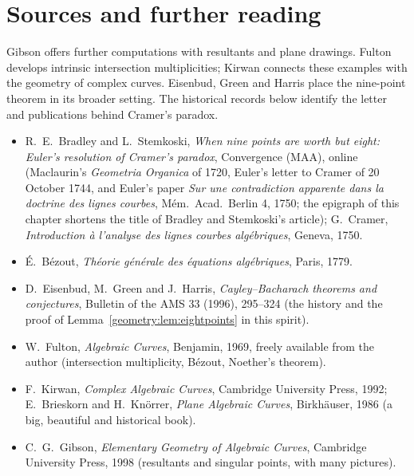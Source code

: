 \section*{Sources and further reading}

Gibson offers further computations with resultants and plane drawings. Fulton develops intrinsic intersection multiplicities; Kirwan connects these examples with the geometry of complex curves. Eisenbud, Green and Harris place the nine-point theorem in its broader setting. The historical records below identify the letter and publications behind Cramer's paradox.

\begin{itemize}
\item R.~E.~Bradley and L.~Stemkoski, \emph{When nine points are worth but eight: Euler's resolution of Cramer's paradox}, Convergence (MAA), online (Maclaurin's
\emph{Geometria Organica} of 1720, Euler's letter to Cramer of 20 October 1744, and Euler's paper \emph{Sur une contradiction apparente dans la doctrine des
lignes courbes}, M\'em.\ Acad.\ Berlin 4, 1750; the epigraph of this chapter shortens the title of Bradley and Stemkoski's article); G.~Cramer, \emph{Introduction \`a l'analyse des lignes courbes
alg\'ebriques}, Geneva, 1750.
\item \'E.~B\'ezout, \emph{Th\'eorie g\'en\'erale des \'equations alg\'ebriques}, Paris, 1779.
\item D.~Eisenbud, M.~Green and J.~Harris, \emph{Cayley--Bacharach theorems and conjectures}, Bulletin of the AMS 33 (1996), 295--324 (the history and the proof
of Lemma~\ref{geometry:lem:eightpoints} in this spirit).
\item W.~Fulton, \emph{Algebraic Curves}, Benjamin, 1969, freely available from the author (intersection multiplicity, B\'ezout, Noether's theorem).
\item F.~Kirwan, \emph{Complex Algebraic Curves}, Cambridge University Press, 1992; E.~Brieskorn and H.~Kn\"orrer, \emph{Plane Algebraic Curves}, Birkh\"auser,
1986 (a big, beautiful and historical book).
\item C.~G.~Gibson, \emph{Elementary Geometry of Algebraic Curves}, Cambridge University Press, 1998 (resultants and singular points, with many pictures).
\end{itemize}
